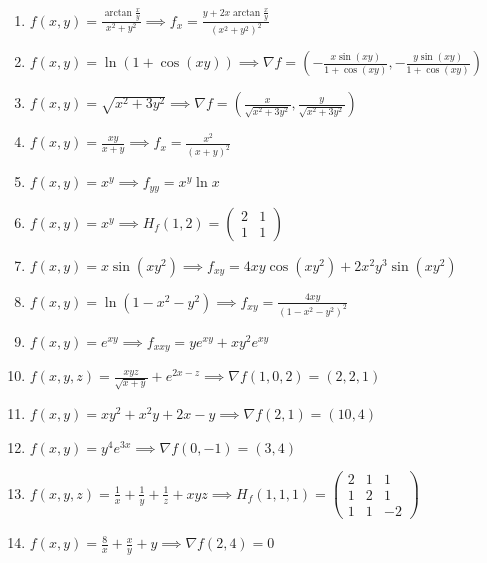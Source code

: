 \documentclass[11pt,a4paper]{article}
\begin{document}
\begin{enumerate}
\item $\displaystyle f(x, y) = \frac{\arctan\frac{x}{y}}{x^{2} + y^{2}} \implies f_{x} = \frac{y + 2x \arctan\frac{x}{y}}{(x^{2} + y^{2})^{2}}$
\item $\displaystyle f(x, y) = \ln(1 + \cos(xy)) \implies \nabla f = \left( -\frac{x \sin(xy)}{1 + \cos(xy)}, -\frac{y \sin(xy)}{1 + \cos(xy)} \right)$
\item $\displaystyle f(x, y) = \sqrt{x^{2} + 3y^{2}} \implies \nabla f = \left( \frac{x}{\sqrt{x^{2} + 3y^{2}}}, \frac{y}{\sqrt{x^{2} + 3y^{2}}} \right)$
\item $\displaystyle f(x, y) = \frac{xy}{x + y} \implies f_{x} = \frac{x^{2}}{(x + y)^{2}}$
\item $\displaystyle f(x, y) = x^{y} \implies f_{yy} = x^{y} \ln x$
\item $\displaystyle f(x, y) = x^{y} \implies H_{f}(1, 2) = \begin{pmatrix} 2 & 1 \\ 1 & 1 \end{pmatrix}$
\item $\displaystyle f(x, y) = x \sin(xy^{2}) \implies f_{xy} = 4xy \cos(xy^{2}) + 2x^{2} y^{3} \sin(xy^{2})$
\item $\displaystyle f(x, y) = \ln(1 - x^{2} - y^{2}) \implies f_{xy} = \frac{4xy}{(1 - x^{2} - y^{2})^{2}}$
\item $\displaystyle f(x, y) = e^{xy} \implies f_{xxy} = y e^{xy} + xy^{2} e^{xy}$
\item $\displaystyle f(x, y, z) = \frac{xyz}{\sqrt{x + y}} + e^{2x - z} \implies \nabla f(1, 0, 2) = (2, 2, 1)$
\item $\displaystyle f(x, y) = xy^{2} + x^{2} y + 2x - y \implies \nabla f(2, 1) = (10, 4)$
\item $\displaystyle f(x, y) = y^{4} e^{3x} \implies \nabla f(0, -1) = (3, 4)$
\item $\displaystyle f(x, y, z) = \frac{1}{x} + \frac{1}{y} + \frac{1}{z} + xyz \implies H_{f}(1, 1, 1) = \begin{pmatrix} 2 & 1 & 1 \\ 1 & 2 & 1 \\ 1 & 1 & -2 \end{pmatrix}$
\item $\displaystyle f(x, y) = \frac{8}{x} + \frac{x}{y} + y \implies \nabla f(2, 4) = 0$
\end{enumerate}
\end{document}
